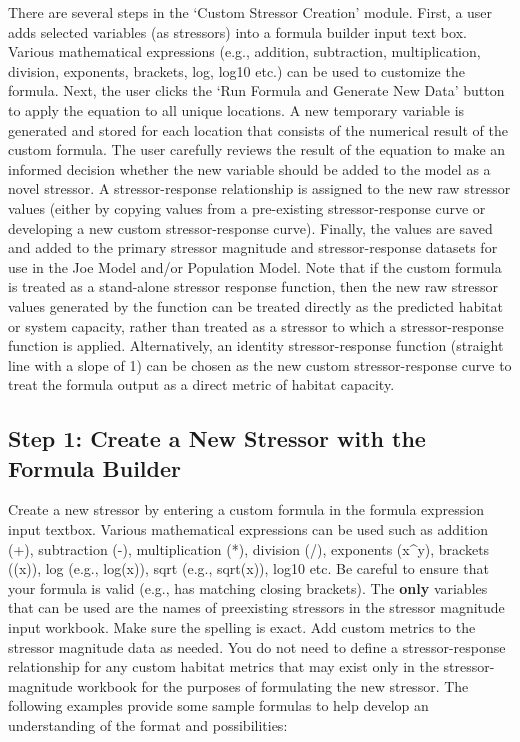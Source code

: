 \documentclass[
  letterpaper,
  DIV=11,
  numbers=noendperiod]{scrreprt}
\begin{document}
There are several steps in the `Custom Stressor Creation' module. First,
a user adds selected variables (as stressors) into a formula builder
input text box. Various mathematical expressions (e.g., addition,
subtraction, multiplication, division, exponents, brackets, log, log10
etc.) can be used to customize the formula. Next, the user clicks the
`Run Formula and Generate New Data' button to apply the equation to all
unique locations. A new temporary variable is generated and stored for
each location that consists of the numerical result of the custom
formula. The user carefully reviews the result of the equation to make
an informed decision whether the new variable should be added to the
model as a novel stressor. A stressor-response relationship is assigned
to the new raw stressor values (either by copying values from a
pre-existing stressor-response curve or developing a new custom
stressor-response curve). Finally, the values are saved and added to the
primary stressor magnitude and stressor-response datasets for use in the
Joe Model and/or Population Model. Note that if the custom formula is
treated as a stand-alone stressor response function, then the new raw
stressor values generated by the function can be treated directly as the
predicted habitat or system capacity, rather than treated as a stressor
to which a stressor-response function is applied. Alternatively, an
identity stressor-response function (straight line with a slope of 1)
can be chosen as the new custom stressor-response curve to treat the
formula output as a direct metric of habitat capacity.

\subsection{Step 1: Create a New Stressor with the Formula
Builder}\label{step-1-create-a-new-stressor-with-the-formula-builder}

Create a new stressor by entering a custom formula in the formula
expression input textbox. Various mathematical expressions can be used
such as addition (+), subtraction (-), multiplication (*), division (/),
exponents (x\^{}y), brackets ((x)), log (e.g., log(x)), sqrt (e.g.,
sqrt(x)), log10 etc. Be careful to ensure that your formula is valid
(e.g., has matching closing brackets). The \textbf{only} variables that
can be used are the names of preexisting stressors in the stressor
magnitude input workbook. Make sure the spelling is exact. Add custom
metrics to the stressor magnitude data as needed. You do not need to
define a stressor-response relationship for any custom habitat metrics
that may exist only in the stressor-magnitude workbook for the purposes
of formulating the new stressor. The following examples provide some
sample formulas to help develop an understanding of the format and
possibilities:
\end{document}
